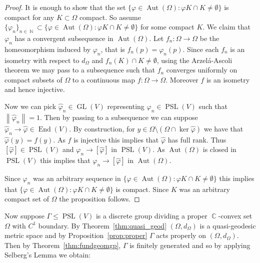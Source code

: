 \documentclass[12pt]{amsart}
\theoremstyle{plain}
\theoremstyle{definition}
\theoremstyle{remark}
\begin{document}
\begin{proof}
It is enough to show that the set $\{ \varphi \in \operatorname{Aut}(\Omega) : \varphi K \cap K \neq \emptyset\}$ is compact for any $K \subset \Omega$ compact. So assume $\{\varphi_n \}_{n \in \operatorname{\mathbb{N}}} \subset \{ \varphi \in \operatorname{Aut}(\Omega) : \varphi K \cap K \neq \emptyset\}$ for some compact $K$. We claim that $\varphi_n$ has a convergent subsequence in $\operatorname{Aut}(\Omega)$. Let $f_n : \Omega \rightarrow \Omega$ be the homeomorphism induced by $\varphi_n$, that is $f_n(p)=\varphi_n(p)$. Since each $f_n$ is an isometry with respect to $d_{\Omega}$ and $f_n(K) \cap K \neq \emptyset$, using the Arzel\'{a}-Ascoli theorem we may pass to a subsequence such that $f_n$ converges uniformly on compact subsets of $\Omega$ to a continuous map $f: \Omega \rightarrow \Omega$. Moreover $f$ is an isometry and hence injective.

Now we can pick $\hat{\varphi}_n \in \operatorname{GL}(V)$ representing $\varphi_n \in \operatorname{PSL}(V)$ such that ${\left\|{\hat{\varphi}_n}\right\|}=1$. Then by passing to a subsequence we can suppose $\hat{\varphi}_n \rightarrow \hat{\varphi} \in \operatorname{End}(V)$. By construction, for $y \in \Omega \setminus (\Omega \cap  \ker \hat{\varphi})$ we have that $\hat{\varphi}(y) = f(y)$. As $f$ is injective this implies that $\hat{\varphi}$ has full rank. Thus $[\hat{\varphi}] \in \operatorname{PSL}(V)$ and  $\varphi_n \rightarrow [\hat{\varphi}]$ in $\operatorname{PSL}(V)$. As $\operatorname{Aut}(\Omega)$ is closed in $\operatorname{PSL}(V)$ this implies that  $\varphi_n \rightarrow [\hat{\varphi}]$ in $\operatorname{Aut}(\Omega)$.

Since $\varphi_n$ was an arbitrary sequence in $ \{ \varphi \in \operatorname{Aut}(\Omega) : \varphi K \cap K \neq \emptyset\}$ this implies that $ \{ \varphi \in \operatorname{Aut}(\Omega) : \varphi K \cap K \neq \emptyset\}$ is compact. Since $K$ was an arbitrary compact set of $\Omega$ the proposition follows. 
\end{proof}

Now suppose $\Gamma \leq \operatorname{PSL}(V)$ is a discrete group dividing a proper $\operatorname{\mathbb{C}}$-convex set $\Omega$ with $C^1$ boundary. By Theorem~\ref{thm:quasi_geod} $(\Omega,d_{\Omega})$ is a quasi-geodesic metric space and by Proposition~\ref{prop:proper} $\Gamma$ acts properly on $(\Omega,d_{\Omega})$. Then by Theorem~\ref{thm:fundgeomgp}, $\Gamma$ is finitely generated and so by applying Selberg's Lemma we obtain:
\end{document}
